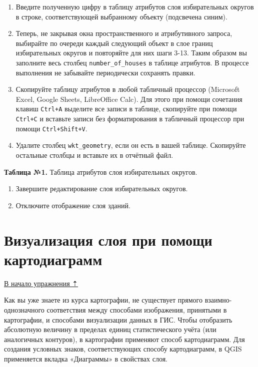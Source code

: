 \documentclass[
  12pt,
]{book}
\begin{document}
\begin{enumerate}
\def\labelenumi{\arabic{enumi}.}
\setcounter{enumi}{12}
\item
  Введите полученную цифру в таблицу атрибутов слоя избирательных округов в строке, соответствующей выбранному объекту (подсвечена синим).
\item
  Теперь, не закрывая окна пространственного и атрибутивного запроса, выбирайте по очереди каждый следующий объект в слое границ избирательных округов и повторяйте для них шаги 3-13. Таким образом вы заполните весь столбец \texttt{number\_of\_houses} в таблице атрибутов. В процессе выполнения не забывайте периодически сохранять правки.
\item
  Скопируйте таблицу атрибутов в любой табличный процессор (Microsoft Excel, Google Sheets, LibreOffice Calc). Для этого при помощи сочетания клавиш \texttt{Ctrl+A} выделите все записи в таблице, скопируйте при помощи \texttt{Ctrl+C} и вставьте записи без форматирования в табличный процессор при помощи \texttt{Ctrl+Shift+V}.
\item
  Удалите столбец \texttt{wkt\_geometry}, если он есть в вашей таблице. Скопируйте остальные столбцы и вставьте их в отчётный файл.
\end{enumerate}

\textbf{Таблица №1.} Таблица атрибутов слоя избирательных округов.

\begin{enumerate}
\def\labelenumi{\arabic{enumi}.}
\setcounter{enumi}{17}
\item
  Завершите редактирование слоя избирательных округов.
\item
  Отключите отображение слоя зданий.
\end{enumerate}

\hypertarget{digitizing-diagrams}{%
\section{Визуализация слоя при помощи картодиаграмм}\label{digitizing-diagrams}}

\protect\hyperlink{digitizing-districts}{В начало упражнения ⇡}

Как вы уже знаете из курса картографии, не существует прямого взаимно-однозначного соответствия между способами изображения, принятыми в картографии, и способами визуализации данных в ГИС. Чтобы отобразить абсолютную величину в пределах единиц статистического учёта (или аналогичных контуров), в картографии применяют способ картодиаграмм. Для создания условных знаков, соответствующих способу картодиаграмм, в QGIS применяется вкладка «Диаграммы» в свойствах слоя.
\end{document}
